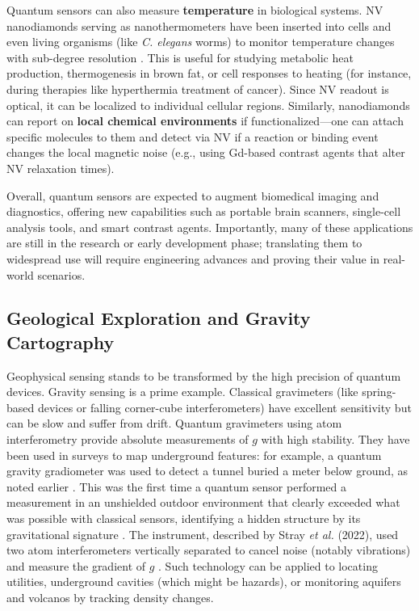 Quantum sensors can also measure \textbf{temperature} in biological
systems. NV nanodiamonds serving as nanothermometers have been
inserted into cells and even living organisms (like \emph{C. elegans}
worms) to monitor temperature changes with sub-degree resolution
. This is useful for studying metabolic heat production, thermogenesis
in brown fat, or cell responses to heating (for instance, during
therapies like hyperthermia treatment of cancer). Since NV readout is
optical, it can be localized to individual cellular
regions. Similarly, nanodiamonds can report on \textbf{local chemical
  environments} if functionalized—one can attach specific molecules to
them and detect via NV if a reaction or binding event changes the
local magnetic noise (e.g., using Gd-based contrast agents that alter
NV relaxation times).



Overall, quantum sensors are expected to augment biomedical imaging
and diagnostics, offering new capabilities such as portable brain
scanners, single-cell analysis tools, and smart contrast
agents. Importantly, many of these applications are still in the
research or early development phase; translating them to widespread
use will require engineering advances and proving their value in
real-world scenarios.



\subsection{Geological Exploration and Gravity Cartography}

Geophysical sensing stands to be transformed by the high precision of
quantum devices. Gravity sensing is a prime example. Classical
gravimeters (like spring-based devices or falling corner-cube
interferometers) have excellent sensitivity but can be slow and suffer
from drift. Quantum gravimeters using atom interferometry provide
absolute measurements of $g$ with high stability. They have been used
in surveys to map underground features: for example, a quantum gravity
gradiometer was used to detect a tunnel buried a meter below ground,
as noted earlier . This was the first time a quantum sensor performed
a measurement in an unshielded outdoor environment that clearly
exceeded what was possible with classical sensors, identifying a
hidden structure by its gravitational signature . The instrument,
described by Stray \emph{et al.} (2022), used two atom interferometers
vertically separated to cancel noise (notably vibrations) and measure
the gradient of $g$ . Such technology can be applied to locating
utilities, underground cavities (which might be hazards), or
monitoring aquifers and volcanos by tracking density changes.



